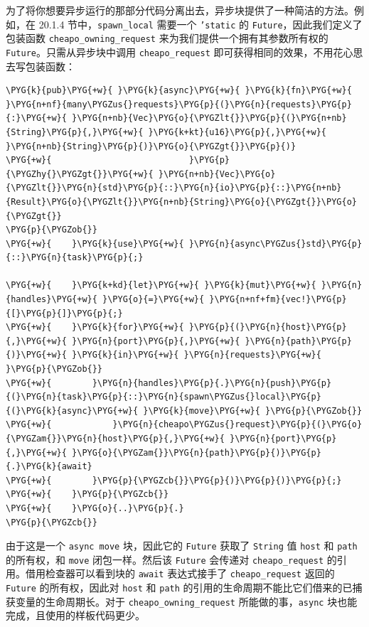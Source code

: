 为了将你想要异步运行的那部分代码分离出去，异步块提供了一种简洁的方法。例如，在 20.1.4 节中，\texttt{spawn\_local} 需要一个 \texttt{'static} 的 \texttt{Future}，因此我们定义了包装函数 \texttt{cheapo\_owning\_request} 来为我们提供一个拥有其参数所有权的 \texttt{Future}。只需从异步块中调用 \texttt{cheapo\_request} 即可获得相同的效果，不用花心思去写包装函数：

\begin{Verbatim}[commandchars=\\\{\},breaklines=true,breakanywhere=true,fontsize=\codefont,xleftmargin=17bp]
\PYG{k}{pub}\PYG{+w}{ }\PYG{k}{async}\PYG{+w}{ }\PYG{k}{fn}\PYG{+w}{ }\PYG{n+nf}{many\PYGZus{}requests}\PYG{p}{(}\PYG{n}{requests}\PYG{p}{:}\PYG{+w}{ }\PYG{n+nb}{Vec}\PYG{o}{\PYGZlt{}}\PYG{p}{(}\PYG{n+nb}{String}\PYG{p}{,}\PYG{+w}{ }\PYG{k+kt}{u16}\PYG{p}{,}\PYG{+w}{ }\PYG{n+nb}{String}\PYG{p}{)}\PYG{o}{\PYGZgt{}}\PYG{p}{)}
\PYG{+w}{                           }\PYG{p}{\PYGZhy{}\PYGZgt{}}\PYG{+w}{ }\PYG{n+nb}{Vec}\PYG{o}{\PYGZlt{}}\PYG{n}{std}\PYG{p}{::}\PYG{n}{io}\PYG{p}{::}\PYG{n+nb}{Result}\PYG{o}{\PYGZlt{}}\PYG{n+nb}{String}\PYG{o}{\PYGZgt{}}\PYG{o}{\PYGZgt{}}
\PYG{p}{\PYGZob{}}
\PYG{+w}{    }\PYG{k}{use}\PYG{+w}{ }\PYG{n}{async\PYGZus{}std}\PYG{p}{::}\PYG{n}{task}\PYG{p}{;}

\PYG{+w}{    }\PYG{k+kd}{let}\PYG{+w}{ }\PYG{k}{mut}\PYG{+w}{ }\PYG{n}{handles}\PYG{+w}{ }\PYG{o}{=}\PYG{+w}{ }\PYG{n+nf+fm}{vec!}\PYG{p}{[}\PYG{p}{]}\PYG{p}{;}
\PYG{+w}{    }\PYG{k}{for}\PYG{+w}{ }\PYG{p}{(}\PYG{n}{host}\PYG{p}{,}\PYG{+w}{ }\PYG{n}{port}\PYG{p}{,}\PYG{+w}{ }\PYG{n}{path}\PYG{p}{)}\PYG{+w}{ }\PYG{k}{in}\PYG{+w}{ }\PYG{n}{requests}\PYG{+w}{ }\PYG{p}{\PYGZob{}}
\PYG{+w}{        }\PYG{n}{handles}\PYG{p}{.}\PYG{n}{push}\PYG{p}{(}\PYG{n}{task}\PYG{p}{::}\PYG{n}{spawn\PYGZus{}local}\PYG{p}{(}\PYG{k}{async}\PYG{+w}{ }\PYG{k}{move}\PYG{+w}{ }\PYG{p}{\PYGZob{}}
\PYG{+w}{            }\PYG{n}{cheapo\PYGZus{}request}\PYG{p}{(}\PYG{o}{\PYGZam{}}\PYG{n}{host}\PYG{p}{,}\PYG{+w}{ }\PYG{n}{port}\PYG{p}{,}\PYG{+w}{ }\PYG{o}{\PYGZam{}}\PYG{n}{path}\PYG{p}{)}\PYG{p}{.}\PYG{k}{await}
\PYG{+w}{        }\PYG{p}{\PYGZcb{}}\PYG{p}{)}\PYG{p}{)}\PYG{p}{;}
\PYG{+w}{    }\PYG{p}{\PYGZcb{}}
\PYG{+w}{    }\PYG{o}{..}\PYG{p}{.}
\PYG{p}{\PYGZcb{}}
\end{Verbatim}

由于这是一个 \texttt{async move} 块，因此它的 \texttt{Future} 获取了 \texttt{String} 值 \texttt{host} 和 \texttt{path} 的所有权，和 \texttt{move} 闭包一样。然后该 \texttt{Future} 会传递对 \texttt{cheapo\_request} 的引用。借用检查器可以看到块的 \texttt{await} 表达式接手了 \texttt{cheapo\_request} 返回的 \texttt{Future} 的所有权，因此对 \texttt{host} 和 \texttt{path} 的引用的生命周期不能比它们借来的已捕获变量的生命周期长。对于 \texttt{cheapo\_owning\_request} 所能做的事，\texttt{async} 块也能完成，且使用的样板代码更少。

